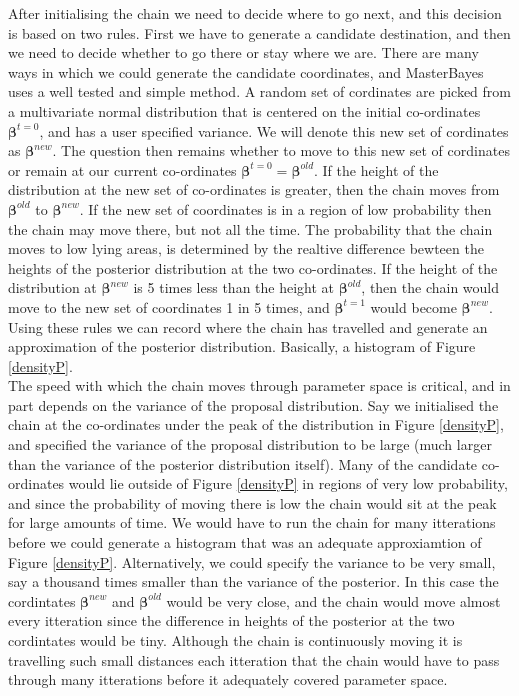\documentclass{article}
\begin{document}
After initialising the chain we need to decide where to go next, and this decision is based on two rules.  First we have to generate a candidate destination, and then we need to decide whether to go there or stay where we are.  There are many ways in which we could generate the candidate coordinates, and MasterBayes uses a well tested and simple method. A random set of cordinates are picked from a multivariate normal distribution that is centered on the initial co-ordinates  $\bm{\beta}^{t=0}$, and has a user specified variance.  We will denote this new set of cordinates as $\bm{\beta}^{new}$. The question then remains whether to move to this new set of cordinates or remain at our current co-ordinates $\bm{\beta}^{t=0} = \bm{\beta}^{old}$.  If the height of the distribution at the new set of co-ordinates is greater, then the chain moves from $\bm{\beta}^{old}$ to $\bm{\beta}^{new}$. If the new set of coordinates is in a region of low probability then the chain may move there, but not all the time.  The probability that the chain moves to low lying areas, is determined by the realtive difference bewteen the heights of the posterior distribution at the two co-ordinates.  If the height of the distribution at $\bm{\beta}^{new}$ is 5 times less than the height at $\bm{\beta}^{old}$, then the chain would move to the new set of coordinates 1 in 5 times, and $\bm{\beta}^{t=1}$ would become $\bm{\beta}^{new}$.  Using these rules we can record where the chain has travelled and generate an approximation of the posterior distribution.  Basically, a histogram of Figure \ref{densityP}.\\

The speed with which the chain moves through parameter space is critical, and in part depends on the variance of the proposal distribution.  Say we initialised the chain at the co-ordinates under the peak of the distribution in Figure \ref{densityP}, and specified the variance of the proposal distribution to be large (much larger than the variance of the posterior distribution itself). Many of the candidate co-ordinates would lie outside of Figure \ref{densityP} in regions of very low probability, and since the probability of moving there is low the chain would sit at the peak for large amounts of time.  We would have to run the chain for many itterations before we could generate a histogram that was an adequate approxiamtion of Figure \ref{densityP}.  Alternatively, we could specify the variance to be very small, say a thousand times smaller than the variance of the posterior.  In this case the cordintates $\bm{\beta}^{new}$ and $\bm{\beta}^{old}$ would be very close, and the chain would move almost every itteration since the difference in heights of the posterior at the two cordintates would be tiny.  Although the chain is continuously moving it is travelling such small distances each itteration that the chain would have to pass through many itterations before it adequately covered parameter space.\\  
\end{document}
